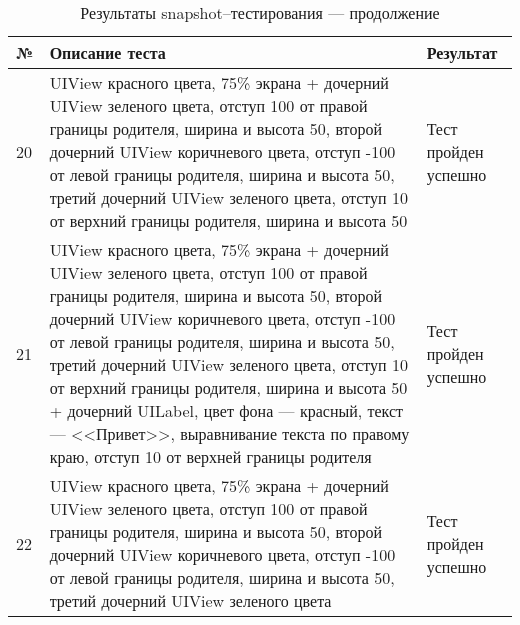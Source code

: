 \begin{table}[!htb]
 \label{table:tests4}
 \begin{center}
  \caption{Результаты snapshot--тестирования --- продолжение}
 \begin{tabular}{|p{0.6cm}|p{10cm}|p{5cm}|}
  \hline
   \bfseries № & \bfseries Описание теста & \bfseries Результат \\ \hline
   20 & UIView красного цвета, 75\% экрана + дочерний UIView зеленого цвета, отступ 100 от правой границы родителя, ширина и высота 50, второй дочерний UIView коричневого цвета, отступ -100 от левой границы родителя, ширина и высота 50, третий дочерний UIView зеленого цвета, отступ 10 от верхний границы родителя, ширина и высота 50 & Тест пройден успешно  \\ \hline
   21 & UIView красного цвета, 75\% экрана + дочерний UIView зеленого цвета, отступ 100 от правой границы родителя, ширина и высота 50, второй дочерний UIView коричневого цвета, отступ -100 от левой границы родителя, ширина и высота 50, третий дочерний UIView зеленого цвета, отступ 10 от верхний границы родителя, ширина и высота 50 + дочерний UILabel, цвет фона --- красный, текст --- <<Привет>>, выравнивание текста по правому краю, отступ 10 от верхней границы родителя & Тест пройден успешно  \\ \hline 
   22 & UIView красного цвета, 75\% экрана + дочерний UIView зеленого цвета, отступ 100 от правой границы родителя, ширина и высота 50, второй дочерний UIView коричневого цвета, отступ -100 от левой границы родителя, ширина и высота 50, третий дочерний UIView зеленого цвета & Тест пройден успешно  \\ \hline \end{tabular}
 \end{center}
\end{table}

\pagebreak


